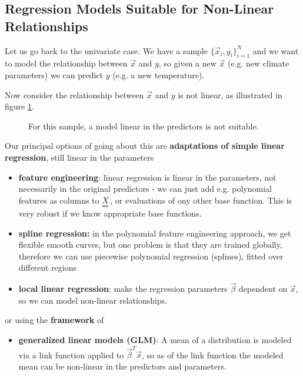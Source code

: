 \subsection{Regression Models Suitable for Non-Linear Relationships}
Let us go back to the univariate case. We have a sample $\{\vec{x}_i,y_i\}_{i=1}^N$ and we want to model
the relationship between $\vec{x}$ and $y$, so given a new $\vec{x}$ (e.g. new climate 
parameters) we can predict $y$ (e.g. a new temperature).

Now consider the relationship between $\vec{x}$ and $y$ is not linear, as illustrated
in figure \ref{fig:nonlinear_relationship}.

\begin{figure}[!htb]
 \centering
 \hfill
 \caption{For this sample, a model linear in the predictors is not suitable.}
 \label{fig:nonlinear_relationship}
\end{figure}

Our principal options of going about this are \textbf{adaptations of simple linear regression}, still
linear in the parameters

\begin{itemize}
    \item \textbf{feature engineering}: linear regression is linear in the parameters, not necessarily in the original predictors - we can just add e.g. polynomial features as columns to $\mat{X}$, or evaluations of ony other base function. This is \textcolor{green1}{very robust} \textcolor{red1}{if we know appropriate base functions.}
    \item \textbf{spline regression:} in the polynomial feature engineering approach, we get flexible smooth curves, but one problem is that they are trained globally, therefore we can use piecewise polynomial regression (splines), fitted over different regions
    \item \textbf{local linear regression}: make the regression parameters $\vec{\beta}$ dependent on $\vec{x}$, so we can model non-linear relationships.
\end{itemize}

or using the \textbf{framework} of
\begin{itemize}
    \item \textbf{generalized linear models (GLM)}: A mean of a distribution is modeled via a link function applied to $\vec{\beta}^T \vec{x}$, so as of the link function
    the modeled mean can be non-linear in the predictors and parameters.
\end{itemize}

